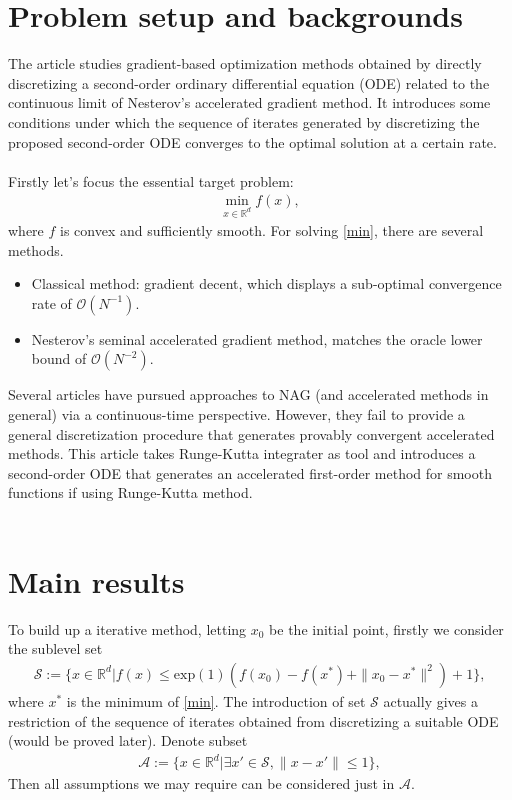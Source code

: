 

\section{Problem setup and backgrounds}

The article \cite{NEURIPS2018_44968aec} studies gradient-based optimization methods obtained by directly
discretizing a second-order ordinary differential equation (ODE) related to the
continuous limit of Nesterov's accelerated gradient method. It introduces some
conditions under which the sequence of iterates generated by discretizing the
proposed second-order ODE converges to the optimal solution at a certain rate.\\\\
Firstly let's focus the essential target problem:
\begin{align}\label{min}
  \mathop{\mathrm{min}}\limits_{x \in \mathbb{R}^{d}} f(x),
\end{align}
where $f$ is convex and sufficiently smooth. For solving \eqref{min}, there are several
methods.
\begin{itemize}
  \item Classical method: gradient decent, which displays a sub-optimal convergence rate of $\mathcal{O}(N^{-1})$.
  \item Nesterov's seminal accelerated gradient method, matches the oracle lower bound of $\mathcal{O}(N^{-2})$.
\end{itemize}
Several articles have pursued approaches to NAG (and accelerated methods in general)
via a continuous-time perspective. However, they fail to provide a general
discretization procedure that generates provably convergent accelerated methods.
This article takes Runge-Kutta integrater as tool and introduces a second-order ODE
that generates an accelerated first-order method for smooth functions if using
Runge-Kutta method.\\\\

\section{Main results}
To build up a iterative method, letting $x_{0}$ be the initial point, firstly we
consider the sublevel set
\begin{align}\label{sublevel_set}
  \mathcal{S} := \{ x \in \mathbb{R}^{d} | f(x) \leq \mathrm{exp}(1) (f(x_{0})
  - f(x^{*}) + \|x_{0} - x^{*}\|^{2}) + 1 \},
\end{align}
where $x^{*}$ is the minimum of \eqref{min}. The introduction of set $\mathcal{S}$
actually gives a restriction of the sequence of iterates obtained from
discretizing a suitable ODE (would be proved later). Denote subset
\begin{align}
  \mathcal{A} := \{ x \in \mathbb{R}^{d} | \exists x' \in \mathcal{S}, \|x-x'\| \leq 1 \},
\end{align}
Then all assumptions we may require can be considered just in $\mathcal{A}$.

